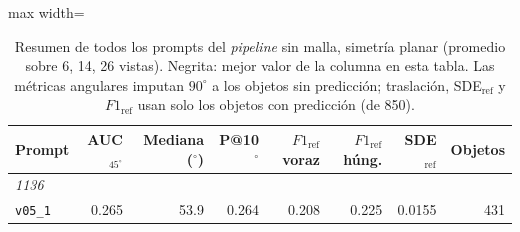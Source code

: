 
\begin{table}[htbp]
\centering
\caption{Resumen de todos los prompts del \textit{pipeline} sin malla, simetría planar (promedio sobre 6, 14, 26 vistas). Negrita: mejor valor de la columna en esta tabla. Las métricas angulares imputan $90^\circ$ a los objetos sin predicción; traslación, SDE$_{\mathrm{ref}}$ y $F1_{\mathrm{ref}}$ usan solo los objetos con predicción (de 850).}
\label{tab:plane_resumen}
\begin{adjustbox}{max width=\textwidth}
\begin{tabular}{lrrrrrrr}
\toprule
Prompt & AUC$_{45^\circ}$ & Mediana ($^\circ$) & P@10$^\circ$ & $F1_{\mathrm{ref}}$ voraz & $F1_{\mathrm{ref}}$ húng. & SDE$_{\mathrm{ref}}$ & Objetos \\
\midrule
\multicolumn{8}{l}{\textit{1136}} \\
\quad\texttt{v05\_1} & 0.265 & 53.9 & 0.264 & 0.208 & 0.225 & 0.0155 & 431 \\
\bottomrule
\end{tabular}
\end{adjustbox}
\end{table}
